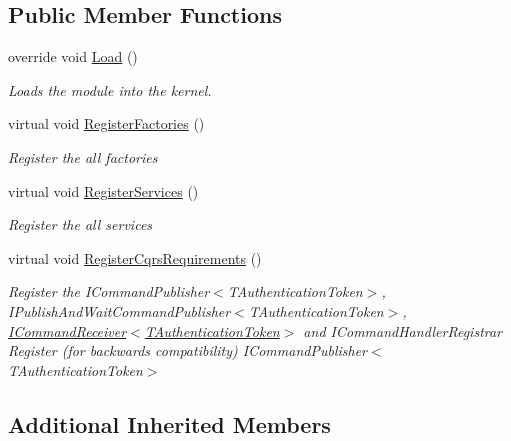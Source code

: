 \subsection*{Public Member Functions}
\begin{DoxyCompactItemize}
\item 
override void \hyperlink{classCqrs_1_1Ninject_1_1Configuration_1_1InProcessCommandBusModule_acf8794d693a38ff114038d6e3dfc961b_acf8794d693a38ff114038d6e3dfc961b}{Load} ()
\begin{DoxyCompactList}\small\item\em Loads the module into the kernel. \end{DoxyCompactList}\item 
virtual void \hyperlink{classCqrs_1_1Ninject_1_1Configuration_1_1InProcessCommandBusModule_a4591fb32f9ec60e3246a9864ab3288cd_a4591fb32f9ec60e3246a9864ab3288cd}{Register\+Factories} ()
\begin{DoxyCompactList}\small\item\em Register the all factories \end{DoxyCompactList}\item 
virtual void \hyperlink{classCqrs_1_1Ninject_1_1Configuration_1_1InProcessCommandBusModule_a292ec8a93f2d35a1b2053bc0b97aa7b2_a292ec8a93f2d35a1b2053bc0b97aa7b2}{Register\+Services} ()
\begin{DoxyCompactList}\small\item\em Register the all services \end{DoxyCompactList}\item 
virtual void \hyperlink{classCqrs_1_1Ninject_1_1Configuration_1_1InProcessCommandBusModule_aee43bfd0d686faa9944dd29305e1ad39_aee43bfd0d686faa9944dd29305e1ad39}{Register\+Cqrs\+Requirements} ()
\begin{DoxyCompactList}\small\item\em Register the I\+Command\+Publisher$<$\+T\+Authentication\+Token$>$, I\+Publish\+And\+Wait\+Command\+Publisher$<$\+T\+Authentication\+Token$>$, \hyperlink{interfaceCqrs_1_1Commands_1_1ICommandReceiver}{I\+Command\+Receiver$<$\+T\+Authentication\+Token$>$} and I\+Command\+Handler\+Registrar Register (for backwards compatibility) I\+Command\+Publisher$<$\+T\+Authentication\+Token$>$ \end{DoxyCompactList}\end{DoxyCompactItemize}
\subsection*{Additional Inherited Members}


